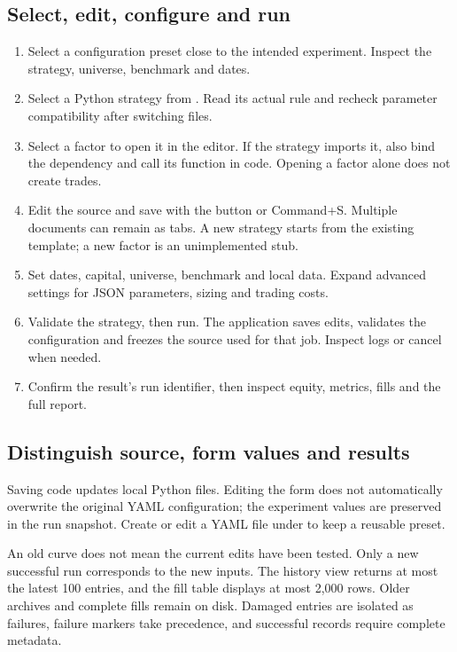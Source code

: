 \documentclass[11pt]{article}
\let\originalsubsection\subsection
\renewcommand{\subsection}{\Needspace{8\baselineskip}\originalsubsection}
\begin{document}
\subsection{Select, edit, configure and run}
\begin{enumerate}
\item Select a configuration preset close to the intended experiment. Inspect the strategy, universe, benchmark and dates.
\item Select a Python strategy from . Read its actual rule and recheck parameter compatibility after switching files.
\item Select a factor to open it in the editor. If the strategy imports it, also bind the dependency and call its function in code. Opening a factor alone does not create trades.
\item Edit the source and save with the button or Command+S. Multiple documents can remain as tabs. A new strategy starts from the existing template; a new factor is an unimplemented stub.
\item Set dates, capital, universe, benchmark and local data. Expand advanced settings for JSON parameters, sizing and trading costs.
\item Validate the strategy, then run. The application saves edits, validates the configuration and freezes the source used for that job. Inspect logs or cancel when needed.
\item Confirm the result's run identifier, then inspect equity, metrics, fills and the full report.
\end{enumerate}

\subsection{Distinguish source, form values and results}
Saving code updates local Python files. Editing the form does not automatically overwrite the original YAML configuration; the experiment values are preserved in the run snapshot. Create or edit a YAML file under  to keep a reusable preset.

An old curve does not mean the current edits have been tested. Only a new successful run corresponds to the new inputs. The history view returns at most the latest 100 entries, and the fill table displays at most 2,000 rows. Older archives and complete fills remain on disk. Damaged entries are isolated as failures, failure markers take precedence, and successful records require complete metadata.
\end{document}
